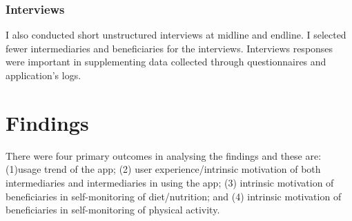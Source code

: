 \subsubsection{Interviews}
I also conducted short unstructured interviews at midline and endline. I selected fewer intermediaries and beneficiaries for the interviews. Interviews responses were important in supplementing data collected through questionnaires and application's logs.
\section{Findings}
There were four primary outcomes in analysing the findings and these are: (1)usage trend of the app; (2) user experience/intrinsic motivation  of both intermediaries and intermediaries in using the app; (3) intrinsic motivation of beneficiaries in self-monitoring of diet/nutrition; and (4) intrinsic motivation of beneficiaries in self-monitoring of physical activity.

